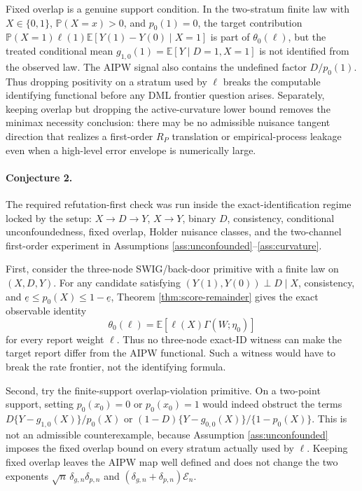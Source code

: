 \documentclass[11pt]{article}
\newcommand{\E}{\mathbb{E}}
\renewcommand{\Pr}{\mathbb{P}}
\theoremstyle{definition}
\theoremstyle{plain}
\theoremstyle{remark}
\begin{document}
Fixed overlap is a genuine support condition.  In the two-stratum finite law
with \(X\in\{0,1\}\), \(\Pr(X=x)>0\), and \(p_0(1)=0\), the target contribution
\(\Pr(X=1)\ell(1)\E[Y(1)-Y(0)\mid X=1]\) is part of
\(\theta_0(\ell)\), but the treated conditional mean \(g_{1,0}(1)=\E[Y\mid
D=1,X=1]\) is not identified from the observed law.  The AIPW signal also
contains the undefined factor \(D/p_0(1)\).  Thus dropping positivity on a
stratum used by \(\ell\) breaks the computable identifying functional before
any DML frontier question arises.  Separately, keeping overlap but dropping
the active-curvature lower bound removes the minimax necessity conclusion:
there may be no admissible nuisance tangent direction that realizes a
first-order \(R_P\) translation or empirical-process leakage even when a
high-level error envelope is numerically large.

\paragraph{Conjecture 2.}
The required refutation-first check was run inside the exact-identification
regime locked by the setup: \(X\to D\to Y\), \(X\to Y\), binary \(D\),
consistency, conditional unconfoundedness, fixed overlap, Holder nuisance
classes, and the two-channel first-order experiment in Assumptions
\ref{ass:unconfounded}--\ref{ass:curvature}.

First, consider the three-node SWIG/back-door primitive with a finite law on
\((X,D,Y)\).  For any candidate satisfying
\((Y(1),Y(0))\perp D\mid X\), consistency, and
\(\underline e\le p_0(X)\le1-\underline e\), Theorem
\ref{thm:score-remainder} gives the exact observable identity
\[
\theta_0(\ell)=\E[\ell(X)\Gamma(W;\eta_0)]
\]
for every report weight \(\ell\).  Thus no three-node exact-ID witness can
make the target report differ from the AIPW functional.  Such a witness would
have to break the rate frontier, not the identifying formula.

Second, try the finite-support overlap-violation primitive.  On a two-point
support, setting \(p_0(x_0)=0\) or \(p_0(x_0)=1\) would indeed obstruct the
terms \(D\{Y-g_{1,0}(X)\}/p_0(X)\) or
\((1-D)\{Y-g_{0,0}(X)\}/\{1-p_0(X)\}\).  This is not an admissible
counterexample, because Assumption \ref{ass:unconfounded} imposes the fixed
overlap bound on every stratum actually used by \(\ell\).  Keeping fixed
overlap leaves the AIPW map well defined and does not change the two exponents
\(\sqrt n\,\delta_{g,n}\delta_{p,n}\) and
\((\delta_{g,n}+\delta_{p,n})\mathcal{E}_n\).
\end{document}
